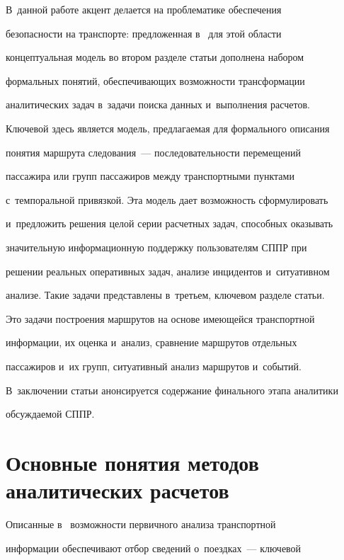 В~данной работе акцент делается на проблематике обеспечения 


безопасности на транспорте: предложенная в~\cite{1-bos} для этой об\-ласти 


концептуальная модель во втором разделе статьи дополнена набором 


формальных понятий, обес\-пе\-чи\-ва\-ющих возможности трансформации 


аналитических задач в~задачи поиска данных и~выполнения расчетов. 


Ключевой здесь является модель, пред\-ла\-га\-емая для формального описания 


понятия маршрута следования~--- по\-сле\-до\-ва\-тель\-ности перемещений 


пассажира или групп пассажиров между транспортными пунктами 


с~темпоральной привязкой. Эта модель дает воз\-мож\-ность сформулировать 


и~предложить решения целой серии расчетных задач, способных оказывать 


значительную информационную поддержку пользователям СППР при 


решении реальных оперативных задач, анализе инцидентов и~ситуативном 


анализе. Такие задачи пред\-став\-ле\-ны в~треть\-ем, ключевом разделе \mbox{статьи}. 


Это задачи по\-стро\-ения маршрутов на основе имеющейся транспортной 


информации, их оценка и~анализ, срав\-не\-ние маршрутов отдельных 


пассажиров и~их групп, ситуативный анализ маршрутов и~событий.





В~заключении статьи анонсируется содержание финального этапа аналитики 


об\-суж\-да\-емой СППР.





\section{Основные понятия методов аналитических расчетов} %





Описанные в~\cite{2-bos} возможности первичного анализа транспортной 


информации обеспечивают отбор сведений о~поездках~--- ключевой 


